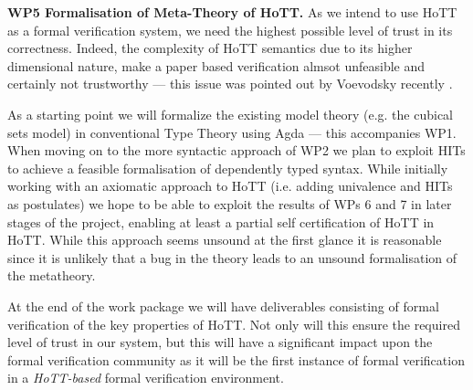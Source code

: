 \documentclass[a4paper,11pt]{article}
\begin{document}
{\bf WP5 Formalisation of Meta-Theory of HoTT.}  As we intend to use
HoTT as a formal verification system, we need the highest possible
level of trust in its correctness. Indeed, the complexity of HoTT
semantics due to its higher dimensional nature, make a paper based
verification almsot unfeasible and certainly not trustworthy --- this
issue was pointed out by Voevodsky recently \cite{voevodsky-ias14}.

As a starting point we will formalize the existing model theory
(e.g. the cubical sets model) in conventional Type Theory using Agda
--- this accompanies WP1. When moving on to the more syntactic
approach of WP2 we plan to exploit HITs to achieve a feasible
formalisation of dependently typed syntax. While initially working
with an axiomatic approach to HoTT (i.e. adding univalence and HITs as
postulates) we hope to be able to exploit the results of WPs 6 and 7
in later stages of the project, enabling at least a partial self
certification of HoTT in HoTT.  While this approach seems unsound at
the first glance it is reasonable since it is unlikely that a bug in
the theory leads to an unsound formalisation of the metatheory.

At the end of the work package we will have
deliverables consisting of formal verification of the key properties
of HoTT. Not only will this ensure the required level of trust in our
system, but this will have a significant impact upon the formal
verification community as it will be the first instance of formal
verification in a {\em HoTT-based} formal verification
environment.


\end{document}
